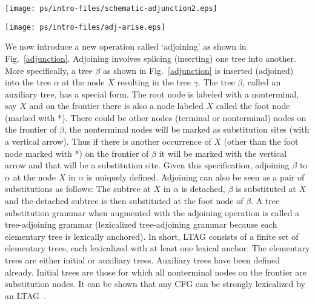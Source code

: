 \begin{figure*}[ht] 
\begin{center}
\texttt{[image: ps/intro-files/schematic-adjunction2.eps]}
\caption{\label{adjunction} Adjoining}
\end{center}
\end{figure*}

\begin{figure*}[ht] 
\begin{center}
\texttt{[image: ps/intro-files/adj-arise.eps]}
\caption{\label{tsg-adj} Adjoining arises out of lexicalization}
\end{center}
\end{figure*}

We now introduce a new operation called `adjoining' as shown in
Fig.~\ref{adjunction}. Adjoining involves splicing (inserting) one
tree into another. More specifically, a tree $\beta$ as shown in
Fig.~\ref{adjunction} is inserted (adjoined) into the tree $\alpha$ at
the node $X$ resulting in the tree $\gamma$. The tree $\beta$, called
an auxiliary tree, has a special form. The root node is labeled with a
nonterminal, say $X$ and on the frontier there is also a node labeled
$X$ called the foot node (marked with *). There could be other nodes
(terminal or nonterminal) nodes on the frontier of $\beta$, the
nonterminal nodes will be marked as substitution sites (with a
vertical arrow). Thus if there is another occurrence of $X$ (other
than the foot node marked with *) on the frontier of $\beta$ it will
be marked with the vertical arrow and that will be a substitution
site. Given this specification, adjoining $\beta$ to $\alpha$ at the
node $X$ in $\alpha$ is uniquely defined. Adjoining can also be seen
as a pair of substitutions as follows: The subtree at $X$ in $\alpha$
is detached, $\beta$ is substituted at $X$ and the detached subtree is
then substituted at the foot node of $\beta$. A tree substitution
grammar when augmented with the adjoining operation is called a
tree-adjoining grammar (lexicalized tree-adjoining grammar because
each elementary tree is lexically anchored). In short, LTAG consists
of a finite set of elementary trees, each lexicalized with at least
one lexical anchor. The elementary trees are either initial or
auxiliary trees. Auxiliary trees have been defined already. Initial
trees are those for which all nonterminal nodes on the frontier are
substitution nodes. It can be shown that any CFG can be strongly
lexicalized by an LTAG~\cite{joshischabes96}.

